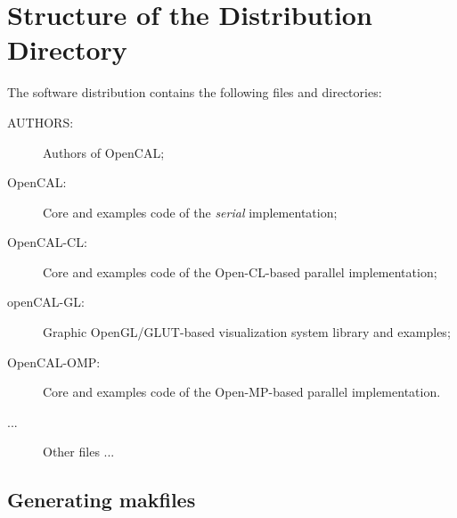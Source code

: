 \section{Structure of the Distribution Directory}

The software distribution contains the following files and
directories:

\begin{description}
\item[AUTHORS: ] Authors of OpenCAL;
\item[OpenCAL: ] Core and examples code of the \emph{serial}
  implementation;
\item[OpenCAL-CL: ] Core and examples code of the Open-CL-based
  parallel implementation;
\item[openCAL-GL: ] Graphic OpenGL/GLUT-based visualization system
  library and examples;
\item[OpenCAL-OMP: ] Core and examples code of the Open-MP-based
  parallel implementation.
\item[...] Other files ...
\end{description}




\subsection{Generating makfiles}

